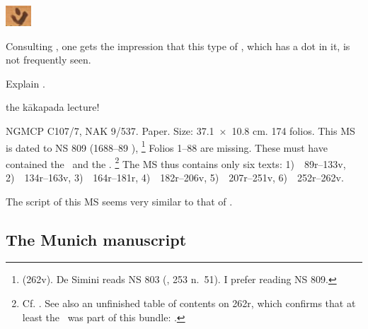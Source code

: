 \includegraphics[scale=1]{images/dottedkakapada_small.png}

Consulting , one gets the impression
that this type of , which has a dot in it,
 is not frequently seen.
 
 Explain \msCc.




the kākapada lecture!

\medskip

NGMCP C107/7, NAK 9/537. Paper. Size: 
37.1~×~10.8 cm. 174 folios. This MS is
dated to NS 809 (1688--89 \CE),%
		\footnote{ (\fol262v). 
		De Simini reads NS 803
		(\citeyear{DeSiminiMSSFromNepal2016}, 253 n.~51).
		I prefer reading NS 809. }
Folios 1--88 are missing. These must have contained the \SDhS\ and the \SDhU.%
			\footnote{Cf. 
				. 
				See also an unfinished table of contents on \fol262r,
				which confirms that at least the \SDhS\ was part 
				of this bundle: .}
The MS thus contains only six texts:
1)~\SDhSangr\ \fols89r--133v,
2)~\Ums\ \fols134r--163v,
3)~\SivaUp\ \fols164r--181r,
4)~\Uums\ \fols182r--206v,
5)~\Vss\ \fols207r--251v, %
6)~\DharmP\ \fols252r--262v. 

The script of this MS seems very similar to that 
of \msPaperA.



\medskip
\subsection{The Munich manuscript}


